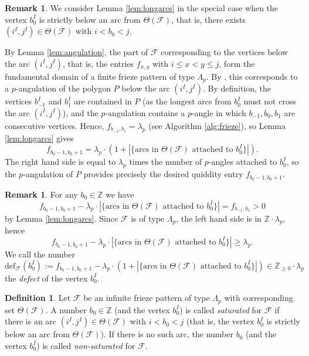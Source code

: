 \documentclass[11pt,a4paper]{amsart}
\theoremstyle{definition}
\newtheorem{Definition}[Lemma]{Definition}
\newtheorem{Remark}[Lemma]{Remark}
\numberwithin{equation}{section}
\begin{document}
\begin{Remark} \label{rem:belowarc}
We consider Lemma \ref{lem:longarcs} in the special case when the vertex $b_0^I$ is strictly below an arc
from $\Theta(\mathcal{F})$, that is, there exists $(i^I,j^I)\in \Theta(\mathcal{F})$ with $i<b_0<j$. 
\smallskip

By Lemma \ref{lem:angulation}, the part of $\mathcal{F}$ corresponding to the vertices below the arc $(i^I,j^I)$,
that is, the entries $f_{x,y}$ with $i\le x<y\le j$, form the fundamental domain of a finite frieze pattern of
type $\Lambda_p$. By \cite[Theorem A]{HJ17}, this corresponds to a $p$-angulation of the polygon $P$ 
below the arc $(i^I,j^I)$.
By definition, the vertices $b_{-1}^I$ and $b_1^I$ are contained in $P$ (as the longest arcs from $b_0^I$ must
not cross the arc $(i^I,j^I)$),
and the $p$-angulation contains a $p$-angle in which $b_{-1},b_0,b_1$ are consecutive vertices. 
Hence, $f_{b_{-1},b_1} =\lambda_p$ (see Algorithm \ref{alg:frieze}), so Lemma \ref{lem:longarcs}
gives
$$f_{b_0-1,b_0+1} = \lambda_p\cdot ( 1+ |\{ \text{arcs in $\Theta(\mathcal{F})$ attached to $b_0^I$}\}|).
$$ 
The right hand side is equal to $\lambda_p$ times the number of $p$-angles attached to $b_0^I$, so
the $p$-angulation of $P$ provides precisely the desired quiddity entry $f_{b_0-1,b_0+1}$. 
\end{Remark}


\begin{Remark} \label{rem:defect}
For any $b_0\in \mathbb{Z}$ we have
$$f_{b_0-1,b_0+1} - \lambda_p\cdot |\{ \text{arcs in $\Theta(\mathcal{F})$ attached to $b_0^I$}\}|
= f_{b_{-1},b_1} >0
$$
by Lemma \ref{lem:longarcs}. Since $\mathcal{F}$ is of type $\Lambda_p$, the left hand side is
in $\mathbb{Z}\cdot \lambda_p$, hence
$$f_{b_0-1,b_0+1} - \lambda_p\cdot |\{ \text{arcs in $\Theta(\mathcal{F})$ attached to $b_0^I$}\}|
\ge \lambda_p.
$$
We call the number
$$\mathrm{def}_{\mathcal{F}}(b_0^I) :=
f_{b_0-1,b_0+1} - \lambda_p\cdot ( 1+ |\{ \text{arcs in $\Theta(\mathcal{F})$ attached to $b_0^I$}\}|)
\in \mathbb{Z}_{\ge 0}\cdot \lambda_p
$$
the {\em defect} of the vertex $b_0^I$. 
\end{Remark}


\begin{Definition}
Let $\mathcal{F}$ be an infinite frieze pattern of type $\Lambda_p$ with corresponding set $\Theta(\mathcal{F})$.
A number $b_0\in \mathbb{Z}$ (and the vertex $b_0^I$) is called {\em saturated} for $\mathcal{F}$
if there is an arc $(i^I,j^I)\in \Theta(\mathcal{F})$
with $i<b_0<j$ (that is, the vertex $b_0^I$ is strictly below an arc from $\Theta(\mathcal{F})$). 
If there is no such arc, the number $b_0$ (and the vertex $b_0^I$) is called {\em non-saturated} for $\mathcal{F}$.   
\end{Definition}
\end{document}
